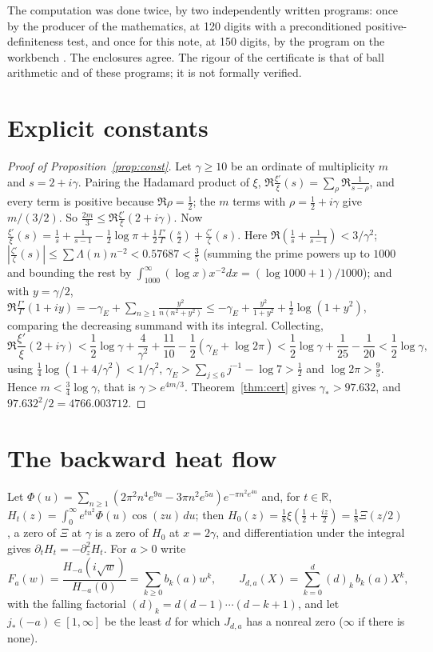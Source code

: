\documentclass[11pt,a4paper]{article}
\theoremstyle{plain}
\theoremstyle{remark}
\newcommand{\R}{\mathbb R}
\begin{document}
The computation was done twice, by two independently written programs: once by the producer of the mathematics,
at 120 digits with a preconditioned positive-definiteness test, and once for this note, at 150 digits, by the program
on the workbench \cite{wb}. The enclosures agree. The rigour of the certificate is that of ball arithmetic and of
these programs; it is not formally verified.

\section{Explicit constants}

\begin{proof}[Proof of Proposition~\ref{prop:const}]
Let $\gamma\ge10$ be an ordinate of multiplicity $m$ and $s=2+i\gamma$. Pairing the Hadamard product of $\xi$,
$\Re\frac{\xi'}{\xi}(s)=\sum_\rho\Re\frac1{s-\rho}$, and every term is positive because $\Re\rho=\frac12$; the $m$
terms with $\rho=\frac12+i\gamma$ give $m/(3/2)$. So $\frac{2m}3\le\Re\frac{\xi'}{\xi}(2+i\gamma)$. Now
$\frac{\xi'}{\xi}(s)=\frac1s+\frac1{s-1}-\frac12\log\pi+\frac12\frac{\Gamma'}{\Gamma}(\frac s2)+\frac{\zeta'}{\zeta}(s)$.
Here $\Re(\frac1s+\frac1{s-1})<3/\gamma^2$; $|\frac{\zeta'}{\zeta}(s)|\le\sum\Lambda(n)n^{-2}<0.57687<\frac35$
(summing the prime powers up to $1000$ and bounding the rest by $\int_{1000}^\infty(\log x)x^{-2}dx=
(\log1000+1)/1000$); and with $y=\gamma/2$, $\Re\frac{\Gamma'}{\Gamma}(1+iy)=-\gamma_E+\sum_{n\ge1}\frac{y^2}{n(n^2+y^2)}
\le-\gamma_E+\frac{y^2}{1+y^2}+\frac12\log(1+y^2)$, comparing the decreasing summand with its integral. Collecting,
\[
 \Re\frac{\xi'}{\xi}(2+i\gamma)<\frac12\log\gamma+\frac4{\gamma^2}+\frac{11}{10}-\frac12(\gamma_E+\log2\pi)
 <\frac12\log\gamma+\frac1{25}-\frac1{20}<\frac12\log\gamma,
\]
using $\frac14\log(1+4/\gamma^2)<1/\gamma^2$, $\gamma_E>\sum_{j\le6}j^{-1}-\log7>\frac12$ and $\log2\pi>\frac95$.
Hence $m<\frac34\log\gamma$, that is $\gamma>e^{4m/3}$. Theorem~\ref{thm:cert} gives $\gamma_*>97.632$, and
$97.632^2/2=4766.003712$.
\end{proof}

\section{The backward heat flow}\label{sec:heat}

Let $\Phi(u)=\sum_{n\ge1}(2\pi^2n^4e^{9u}-3\pi n^2e^{5u})e^{-\pi n^2e^{4u}}$ and, for $t\in\R$,
$H_t(z)=\int_0^\infty e^{tu^2}\Phi(u)\cos(zu)\,du$; then $H_0(z)=\frac18\xi(\frac12+\frac{iz}2)=\frac18\Xi(z/2)$
\cite[§1, (1)--(4)]{rodgers-tao}, a zero of $\Xi$ at $\gamma$ is a zero of $H_0$ at $x=2\gamma$, and differentiation under
the integral gives $\partial_tH_t=-\partial_z^2H_t$. For $a>0$ write
\[
 F_a(w)=\frac{H_{-a}(i\sqrt w)}{H_{-a}(0)}=\sum_{k\ge0}b_k(a)w^k,\qquad
 J_{d,a}(X)=\sum_{k=0}^d(d)_k\,b_k(a)X^k,
\]
with the falling factorial $(d)_k=d(d-1)\cdots(d-k+1)$, and let $j_*(-a)\in[1,\infty]$ be the least $d$ for which
$J_{d,a}$ has a nonreal zero ($\infty$ if there is none).
\end{document}
